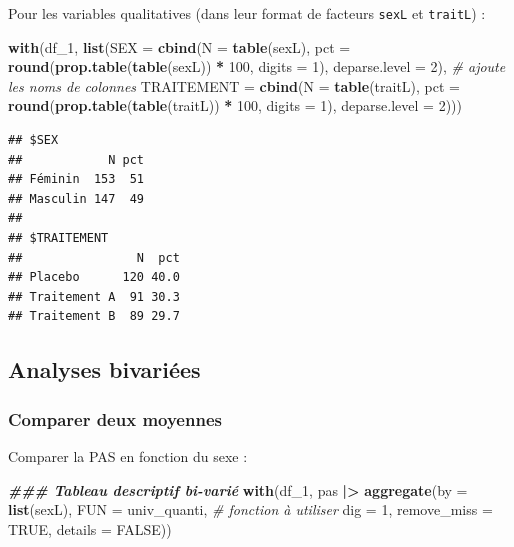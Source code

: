 \documentclass[
]{book}
\newenvironment{Shaded}{\begin{snugshade}}{\end{snugshade}}
\newcommand{\AttributeTok}[1]{\textcolor[rgb]{0.13,0.29,0.53}{#1}}
\newcommand{\CommentTok}[1]{\textcolor[rgb]{0.56,0.35,0.01}{\textit{#1}}}
\newcommand{\ConstantTok}[1]{\textcolor[rgb]{0.56,0.35,0.01}{#1}}
\newcommand{\DecValTok}[1]{\textcolor[rgb]{0.00,0.00,0.81}{#1}}
\newcommand{\DocumentationTok}[1]{\textcolor[rgb]{0.56,0.35,0.01}{\textbf{\textit{#1}}}}
\newcommand{\FunctionTok}[1]{\textcolor[rgb]{0.13,0.29,0.53}{\textbf{#1}}}
\newcommand{\NormalTok}[1]{#1}
\newcommand{\SpecialCharTok}[1]{\textcolor[rgb]{0.81,0.36,0.00}{\textbf{#1}}}
\begin{document}
Pour les variables qualitatives (dans leur format de facteurs \texttt{sexL} et \texttt{traitL}) :

\begin{Shaded}
\begin{Highlighting}[]
\FunctionTok{with}\NormalTok{(df\_1,}
     \FunctionTok{list}\NormalTok{(}\AttributeTok{SEX =} \FunctionTok{cbind}\NormalTok{(}\AttributeTok{N =} \FunctionTok{table}\NormalTok{(sexL),}
                      \AttributeTok{pct =} \FunctionTok{round}\NormalTok{(}\FunctionTok{prop.table}\NormalTok{(}\FunctionTok{table}\NormalTok{(sexL)) }\SpecialCharTok{*} \DecValTok{100}\NormalTok{, }\AttributeTok{digits =} \DecValTok{1}\NormalTok{),}
                      \AttributeTok{deparse.level =} \DecValTok{2}\NormalTok{), }\CommentTok{\# ajoute les noms de colonnes}
          \AttributeTok{TRAITEMENT =} \FunctionTok{cbind}\NormalTok{(}\AttributeTok{N =} \FunctionTok{table}\NormalTok{(traitL),}
                             \AttributeTok{pct =} \FunctionTok{round}\NormalTok{(}\FunctionTok{prop.table}\NormalTok{(}\FunctionTok{table}\NormalTok{(traitL)) }\SpecialCharTok{*} \DecValTok{100}\NormalTok{, }
                                         \AttributeTok{digits =} \DecValTok{1}\NormalTok{), }
                             \AttributeTok{deparse.level =} \DecValTok{2}\NormalTok{)))}
\end{Highlighting}
\end{Shaded}

\begin{verbatim}
## $SEX
##            N pct
## Féminin  153  51
## Masculin 147  49
## 
## $TRAITEMENT
##                N  pct
## Placebo      120 40.0
## Traitement A  91 30.3
## Traitement B  89 29.7
\end{verbatim}

\subsection{Analyses bivariées}\label{analyses-bivariuxe9es-1}

\subsubsection{Comparer deux moyennes}\label{comparer-deux-moyennes}

Comparer la PAS en fonction du sexe :

\begin{Shaded}
\begin{Highlighting}[]
\DocumentationTok{\#\#\# Tableau descriptif bi{-}varié}
\FunctionTok{with}\NormalTok{(df\_1,}
\NormalTok{     pas }\SpecialCharTok{|\textgreater{}}
       \FunctionTok{aggregate}\NormalTok{(}\AttributeTok{by =} \FunctionTok{list}\NormalTok{(sexL), }
                 \AttributeTok{FUN =}\NormalTok{ univ\_quanti, }\CommentTok{\# fonction à utiliser}
                 \AttributeTok{dig =} \DecValTok{1}\NormalTok{, }\AttributeTok{remove\_miss =} \ConstantTok{TRUE}\NormalTok{, }\AttributeTok{details =} \ConstantTok{FALSE}\NormalTok{)) }
\end{Highlighting}
\end{Shaded}
\end{document}
